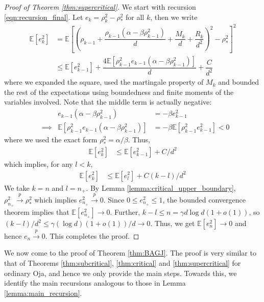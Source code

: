 \documentclass[12pt]{article}
\newtheorem{theorem}{Theorem}[section]  %
\newcommand{\E}{\mathbb{E}}
\begin{document}

\medskip

\begin{proof}[Proof of Theorem \ref{thm:supercritical}]
    We start with recursion \ref{eqn:recursion_final}. Let $e_k=\rho_k^2-\rho_*^2$ for all $k$, then we write
    \begin{align*}
        \E[e_k^2] &= \E\left[\left(\rho_{k-1}+\dfrac{\rho_{k-1}(\alpha-\beta\rho_{k-1}^2)}{d}+\dfrac{M_k}{d}+\dfrac{R_k}{d^2}\right)^2-\rho_*^2\right]^2\\
        &\leq \E[e^2_{k-1}] + \dfrac{4\E[\rho^2_{k-1}e_{k-1}(\alpha-\beta\rho^2_{k-1})]}{d}+\dfrac{C}{d^2}
    \end{align*}where we expanded the square, used the martingale property of $M_k$ and bounded the rest of the expectations using boundedness and finite moments of the variables involved. Note that the middle term is actually negative:
    \begin{align*}
        & &e_{k-1}(\alpha-\beta\rho^2_{k-1}) &= -\beta e_{k-1}^2\\
        &\implies &\E[\rho^2_{k-1}e_{k-1}(\alpha-\beta\rho^2_{k-1})] &= -\beta \E[\rho^2_{k-1}e_{k-1}^2]<0
    \end{align*}where we used the exact form $\rho_*^2=\alpha/\beta$. Thus, 
    \begin{align*}
        \E[e_k^2] &\leq \E[e_{k-1}^2]+C/d^2
    \end{align*}which implies, for any $l<k$,
    \begin{align*}
        \E[e_k^2] &\leq \E[e_l^2] + C(k-l)/d^2
    \end{align*}We take $k=n$ and $l=n_+$. By Lemma \ref{lemma:critical_upper_boundary}, $\rho_{n_+}^2\stackrel{p}{\to}\rho_*^2$ which implies $e_{n_+}^2\stackrel{p}{\to}0$. Since $0\leq e_{n_+}^2\leq 1$, the bounded convergence theorem implies that $\E[e_{n_+}^2]\to 0$. Further, $k-l\leq n=\gamma d\log d(1 + o(1))$, so $(k-l)/d^2\leq \gamma(\log d)(1+o(1))/d\to 0$. Thus, we get $\E[e_n^2]\to0$ and hence $e_n\stackrel{p}{\to}0$. This completes the proof.
\end{proof}

We now come to the proof of Theorem \ref{thm:BAGJ}. The proof is very similar to that of Theorems \ref{thm:subcritical}, \ref{thm:critical} and \ref{thm:supercritical} for ordinary Oja, and hence we only provide the main steps. Towards this, we identify the main recursions analogous to those in Lemma \ref{lemma:main_recursion}.
\end{document}
